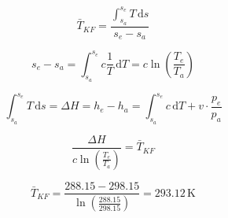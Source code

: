 \[ 
\bar{T}_{KF} = \frac{\int_{s_a}^{s_e} T \, \text{d}s}{s_e - s_a} 
\]  

\[ 
s_e - s_a = \int_{s_a}^{s_e} c \frac{1}{T} \, \text{d}T = c \ln \left( \frac{T_e}{T_a} \right) 
\]  

\[ 
\int_{s_a}^{s_e} T \, \text{d}s = \Delta H = h_e - h_a = \int_{s_a}^{s_e} c \, \text{d}T + v \cdot \frac{p_e}{p_a} 
\]  

\[ 
\frac{\Delta H}{c \ln \left( \frac{T_e}{T_a} \right)} = \bar{T}_{KF} 
\]  

\[ 
\bar{T}_{KF} = \frac{288.15 - 298.15}{\ln \left( \frac{288.15}{298.15} \right)} = 293.12 \, \text{K} 
\]